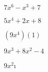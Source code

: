 \documentclass{article}
\begin{document}
\begin{multicols}{2}
\item $7x^{6}-x^{3}+7$\item $5x^{4}+2x+8$\item $(9x^{4})(1)$\item $9x^{3}+8x^2-4$\item $9x^2$\i
\end{multicols}
\end{document}
